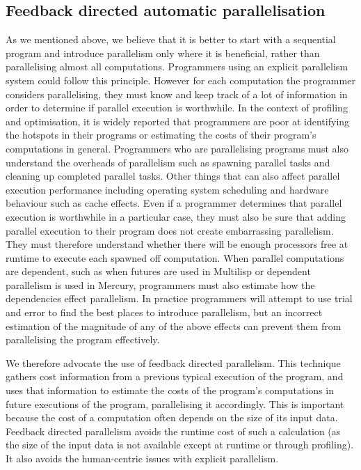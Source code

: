 \subsection{Feedback directed automatic parallelisation}
\label{sec:intro_auto_par}

As we mentioned above,
we believe that it is better to start with a sequential program and
introduce parallelism only where it is beneficial,
rather than parallelising almost all computations.
Programmers using an explicit parallelism system could follow this
principle.
However 
for each computation the programmer considers parallelising,
they must know and keep track of a lot of
information in order to determine if parallel execution is worthwhile.
In the context of profiling and optimisation,
it is widely reported that programmers are poor at identifying the
hotspots in their programs or
estimating the costs of their program's computations in general.
Programmers who are parallelising programs must also understand the
overheads of parallelism such as
spawning parallel tasks and
cleaning up completed parallel tasks.
Other things that can also affect parallel execution performance
including
operating system scheduling and
hardware behaviour such as cache effects.
Even if a programmer determines that parallel execution is worthwhile in
a particular case,
they must also be sure that adding parallel execution to their program
does not create embarrassing parallelism.
They must therefore understand whether there will be enough
processors free at runtime to execute each spawned off computation.
When parallel computations are dependent,
such as when futures are used in Multilisp or
dependent parallelism is used in Mercury,
programmers must also estimate how the dependencies effect parallelism.
In practice programmers will attempt to use trial and error to find the
best places to introduce parallelism,
but an incorrect estimation of the magnitude of any of the above effects can
prevent them from parallelising the program effectively.

We therefore advocate the use of feedback directed parallelism.
This technique gathers cost information from a previous typical execution of
the program,
and uses that information to estimate the costs of the program's
computations in future executions of the program,
parallelising it accordingly.
This is important because the cost of a computation often depends on the
size of its input data.
Feedback directed parallelism avoids the runtime cost of such a calculation
(as the size of the input data is not available except at runtime or through
profiling).
It also avoids the human-centric issues with explicit parallelism.

